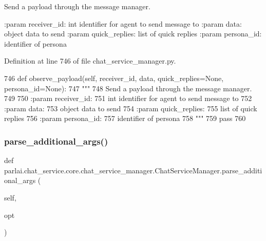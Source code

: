 \begin{DoxyVerb}Send a payload through the message manager.

:param receiver_id:
    int identifier for agent to send message to
:param data:
    object data to send
:param quick_replies:
    list of quick replies
:param persona_id:
    identifier of persona
\end{DoxyVerb}
 

Definition at line 746 of file chat\+\_\+service\+\_\+manager.\+py.


\begin{DoxyCode}
746     \textcolor{keyword}{def }observe\_payload(self, receiver\_id, data, quick\_replies=None, persona\_id=None):
747         \textcolor{stringliteral}{"""}
748 \textcolor{stringliteral}{        Send a payload through the message manager.}
749 \textcolor{stringliteral}{}
750 \textcolor{stringliteral}{        :param receiver\_id:}
751 \textcolor{stringliteral}{            int identifier for agent to send message to}
752 \textcolor{stringliteral}{        :param data:}
753 \textcolor{stringliteral}{            object data to send}
754 \textcolor{stringliteral}{        :param quick\_replies:}
755 \textcolor{stringliteral}{            list of quick replies}
756 \textcolor{stringliteral}{        :param persona\_id:}
757 \textcolor{stringliteral}{            identifier of persona}
758 \textcolor{stringliteral}{        """}
759         \textcolor{keywordflow}{pass}
760 
\end{DoxyCode}
\mbox{\label{classparlai_1_1chat__service_1_1core_1_1chat__service__manager_1_1ChatServiceManager_acf204463db3ea8e4a3929d5191890cbc}} 
\subsubsection{\texorpdfstring{parse\+\_\+additional\+\_\+args()}{parse\_additional\_args()}}
{\footnotesize\ttfamily def parlai.\+chat\+\_\+service.\+core.\+chat\+\_\+service\+\_\+manager.\+Chat\+Service\+Manager.\+parse\+\_\+additional\+\_\+args (\begin{DoxyParamCaption}\item[{}]{self,  }\item[{}]{opt }\end{DoxyParamCaption})}

